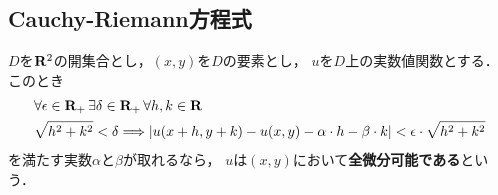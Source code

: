 \subsection{Cauchy-Riemann方程式}
	\begin{screen}
		\begin{dfn}[全微分可能]\label{def:totally_differentiability}
			$D$を$\mathbf{R}^2$の開集合とし，$(x,y)$を$D$の要素とし，
			$u$を$D$上の実数値関数とする．このとき
			\begin{align}
				&\forall \epsilon \in \mathbf{R}_+\, \exists \delta \in \mathbf{R}_+\, \forall h,k \in \mathbf{R}\, \\
				&\sqrt{h^2 + k^2} < \delta \Longrightarrow
				\left|u(x+h,y+k) - u(x,y) - \alpha \cdot h - \beta \cdot k\right| 
				< \epsilon \cdot \sqrt{h^2 + k^2}
				\label{fom:def_totally_differentiability}
			\end{align}
			を満たす実数$\alpha$と$\beta$が取れるなら，
			$u$は$(x,y)$において{\bf 全微分可能である}という．
		\end{dfn}
	\end{screen}
	
